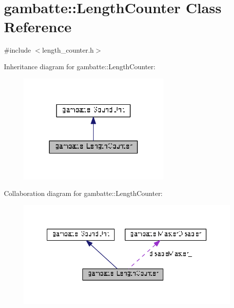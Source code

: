 \hypertarget{classgambatte_1_1LengthCounter}{}\section{gambatte\+:\+:Length\+Counter Class Reference}
\label{classgambatte_1_1LengthCounter}


{\ttfamily \#include $<$length\+\_\+counter.\+h$>$}



Inheritance diagram for gambatte\+:\+:Length\+Counter\+:\nopagebreak
\begin{figure}[H]
\begin{center}
\leavevmode
\includegraphics[width=215pt]{classgambatte_1_1LengthCounter__inherit__graph}
\end{center}
\end{figure}


Collaboration diagram for gambatte\+:\+:Length\+Counter\+:
\nopagebreak
\begin{figure}[H]
\begin{center}
\leavevmode
\includegraphics[width=348pt]{classgambatte_1_1LengthCounter__coll__graph}
\end{center}
\end{figure}
